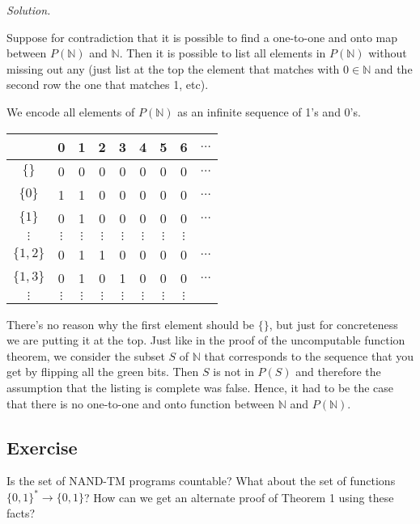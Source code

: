 \documentclass[11pt]{article}
\theoremstyle{definition}
\theoremstyle{remark}
\begin{document}
\emph{Solution.} 

Suppose for contradiction that it is possible to find a one-to-one and onto map between $P(\mathbb{N})$ and $\mathbb{N}$. 
Then it is possible to list all elements in $P(\mathbb{N})$ without missing out any (just list at the top the element that
matches with $0 \in \mathbb{N}$ and the second row the one that matches 1, etc).

We encode all elements of $P(\mathbb{N})$ as an infinite sequence of 1's and 0's.

\begin{center}
    \begin{tabular}{c|cccccccc}
         & 0 & 1 & 2 & 3 & 4 & 5 & 6 & $\dots$ \\ 
        \hline
        $\{ \}$ & \cellcolor{green!20}0 & 0 & 0 & 0 & 0 & 0 & 0 & $\dots$ \\ 
        $\{ 0 \}$ & 1 & \cellcolor{green!20}1 & 0 & 0 & 0 & 0 & 0 & $\dots$ \\ 
        $\{ 1\}$ & 0 & 1 & \cellcolor{green!20}0 & 0 & 0 & 0 & 0 & $\dots$ \\ 
        $\vdots$ & $\vdots$ & $\vdots$ & $\vdots$ & $\vdots$ & $\vdots$ & $\vdots$ & $\vdots$ & \\
        $\{1, 2\}$ & 0 & 1 & 1 & 0 & \cellcolor{green!20}0 & 0 & 0 & $\dots$ \\ 
        $\{1, 3\}$ & 0 & 1 & 0 & 1 & 0 & \cellcolor{green!20}0 & 0 & $\dots$ \\ 
        $\vdots$ & $\vdots$ & $\vdots$ & $\vdots$ & $\vdots$ & $\vdots$ & $\vdots$ & $\vdots$ & 
    \end{tabular}
\end{center}

There's no reason why the first element should be $\{ \}$, but just for concreteness we are putting it at the top. 
Just like in the proof of the uncomputable function theorem, we consider the subset $S$ of $\mathbb{N}$ that corresponds to the
sequence that you get by flipping all the green bits. Then $S$ is not in $P(S)$ and therefore the assumption that the listing is complete
was false. Hence, it had to be the case that there is no one-to-one and onto function between $\mathbb{N}$ and $P(\mathbb{N})$.

\subsection{Exercise}
Is the set of NAND-TM programs countable? What about the set of functions $\{0,1\}^* \to \{0,1\}$? How can we get an alternate proof of Theorem 1 using these facts?
\end{document}
